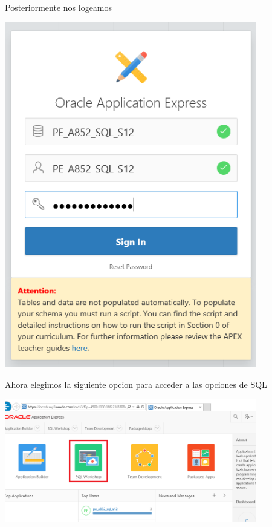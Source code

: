 \documentclass[a4paper,openright,12pt]{book}
\begin{document}
Posteriormente nos logeamos\\
\begin{center}
\includegraphics[width=11cm]{./images/6-1 Ejercicio/1.png}\\
\end{center}

Ahora elegimos la siguiente opcion para acceder a las opciones de SQL\\
\begin{center}
\includegraphics[width=11cm]{./images/6-1 Ejercicio/2.png}\\
\end{center}
\end{document}
